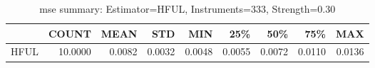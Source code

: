 \begin{table}[ht]
\centering
\caption{mse summary: Estimator=HFUL, Instruments=333, Strength=0.30}
\begin{tabular}{lrrrrrrrr}
\toprule
 & COUNT & MEAN & STD & MIN & 25\% & 50\% & 75\% & MAX \\
\midrule
HFUL & 10.0000 & 0.0082 & 0.0032 & 0.0048 & 0.0055 & 0.0072 & 0.0110 & 0.0136 \\
\bottomrule
\end{tabular}
\end{table}
